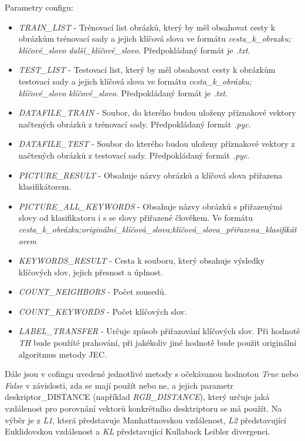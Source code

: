 \documentclass[czech,BP]{thesiskiv}
\begin{document}
\vspace{1cm} 
\noindent Parametry configu:
\begin{itemize}
	\item \textit{TRAIN\_LIST} - Trénovací list obrázků, který by měl obsahovat cesty k obrázkům trénovací sady a jejich klíčová slova ve formátu \textit{cesta\_k\_obrazku; klíčové\_slovo další\_klíčové\_slovo}. Předpokládaný formát je \textit{.txt}.
	\item \textit{TEST\_LIST} - Testovací list, který by měl obsahovat cesty k obrázkům testovací sady a jejich klíčová slova ve formátu \textit{cesta\_k\_obrázku; klíčové\_slovo klíčové\_slovo}. Předpokládaný formát je \textit{.txt}.
	\item \textit{DATAFILE\_TRAIN} - Soubor, do kterého budou uloženy příznakové vektory načtených obrázků z trénovací sady. Předpokládaný formát \textit{.pyc}.
		\item \textit{DATAFILE\_TEST} - Soubor do kterého budou uloženy příznakové vektory z načtených obrázků z testovací sady. Předpokládaný formát \textit{.pyc}.
	\item \textit{PICTURE\_RESULT} - Obsahuje názvy obrázků a klíčová slova přiřazena klasifikátorem.
	\item \textit{PICTURE\_ALL\_KEYWORDS} - Obsahuje názvy obrázků s přiřazenými slovy od klasifikatoru i s se slovy přiřazené člověkem. Ve formátu \textit{cesta\_k\_obrázku;originální\_klíčová\_slova;klíčová\_slova\_přiřazena\_klasifikátorem}
	\item \textit{KEYWORDS\_RESULT} - Cesta k souboru, který obsahuje výsledky klíčových slov, jejich přesnost a úplnost.
	\item \textit{COUNT\_NEIGHBORS} - Počet sousedů.
	\item \textit{COUNT\_KEYWORDS} - Počet klíčových slov.
	\item \textit{LABEL\_TRANSFER} - Určuje způsob přiřazování klíčových slov. Při hodnotě \textit{TH} bude použíté prahování, při jakékoliv jiné hodnotě bude použit originální algoritmus metody JEC.
\end{itemize}
Dále jsou v cofingu uvedené jednotlivé metody s očekávanou hodnotou \textit{True} nebo \textit{False} v závislosti, zda se mají použít nebo ne, a jejich parametr deskriptor\_DISTANCE (například \textit{RGB\_DISTANCE}), který určuje jaká vzdálenost pro porovnání vektorů konkrétního desktriptoru se má použít. Na výběr je z \textit{L1}, která představuje Manhattnovskou vzdálenost, \textit{L2} představující Euklidovskou vzdálenost a \textit{KL} představující Kullaback Leibler divergenci.
\end{document}

